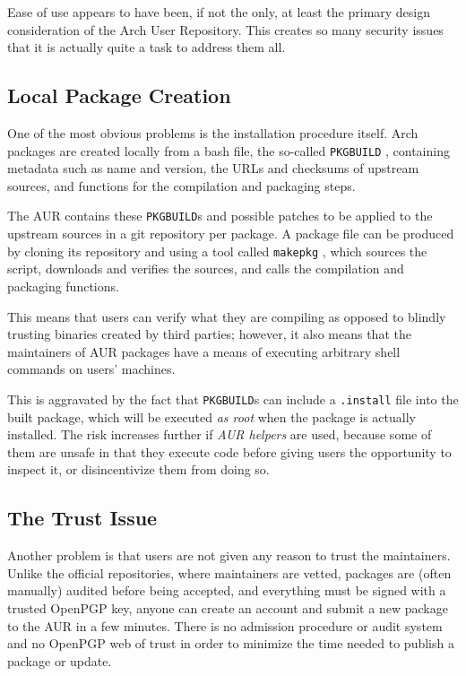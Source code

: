 \label{sec:motivation}
Ease of use appears to have been, if not the only, at least the primary design consideration of the Arch User Repository. This creates so many security issues that it is actually quite a task to address them all.

\subsection{Local Package Creation}
One of the most obvious problems is the installation procedure itself.
Arch packages are created locally from a bash file, the so-called \texttt{PKGBUILD} \cite{wiki:PKGBUILD}, containing metadata such as name and version, the URLs and checksums of upstream sources, and functions for the compilation and packaging steps.

The AUR contains these \texttt{PKGBUILD}s and possible patches to be applied to the upstream sources in a git repository per package.
A package file can be produced by cloning its repository and using a tool called \texttt{makepkg} \cite{wiki:PackageCreation}, which sources the script, downloads and verifies the sources, and calls the compilation and packaging functions.

This means that users can verify what they are compiling as opposed to blindly trusting binaries created by third parties; however, it also means that the maintainers of AUR packages have a means of executing arbitrary shell commands on users' machines.

This is aggravated by the fact that \texttt{PKGBUILD}s can include a \texttt{.install} file into the built package, which will be executed \emph{as root} when the package is actually installed.
The risk increases further if \emph{AUR helpers} are used, because some of them are unsafe in that they execute code before giving users the opportunity to inspect it, or disincentivize them from doing so.

\subsection{The Trust Issue}
Another problem is that users are not given any reason to trust the maintainers.
Unlike the official repositories, where maintainers are vetted, packages are (often manually) audited before being accepted, and everything must be signed with a trusted OpenPGP key, anyone can create an account and submit a new package to the AUR in a few minutes.
There is no admission procedure or audit system and no OpenPGP web of trust in order to minimize the time needed to publish a package or update.

